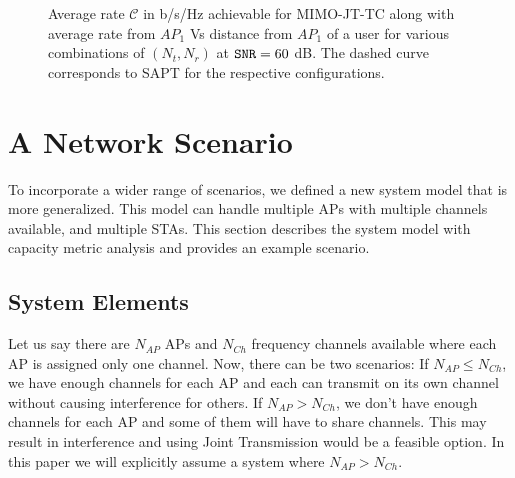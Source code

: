 \begin{figure}[!]
	\caption[Average Achievable Rate]{Average rate $\mathcal{C}$ in b/s/Hz achievable for MIMO-JT-TC along with average rate from $AP_1$ Vs distance from $AP_1$ of a user for various combinations of $(N_t,N_r)$ at $\mathtt{SNR}=60$ dB. The dashed curve corresponds to SAPT for the respective configurations.}%
	\label{fig:rate_theory_mimo}
\end{figure}


\section{A Network Scenario}
\label{sec:system_definition}
To incorporate a wider range of scenarios, we defined a new system model that is more generalized. This model can handle multiple APs with multiple channels available, and multiple STAs. This section describes the system model with capacity metric analysis and provides an example scenario.


\subsection{System Elements}
Let us say there are $N_{AP}$ APs and $N_{Ch}$ frequency channels available where each AP is assigned only one channel.
Now, there can be two scenarios:
If $N_{AP} \leq N_{Ch}$, we have enough channels for each AP and each can transmit on its own channel without causing interference for others.
If $N_{AP} > N_{Ch}$, we don't have enough channels for each AP and some of them will have to share channels.
This may result in interference and using Joint Transmission would be a feasible option. In this paper we will explicitly assume a system where $N_{AP} > N_{Ch}$.


